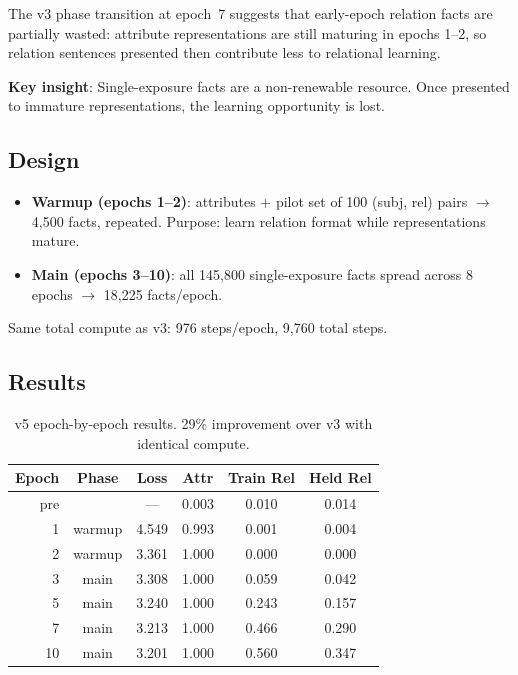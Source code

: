 \documentclass[11pt]{article}
\begin{document}
The v3 phase transition at epoch~7 suggests that early-epoch relation facts are
partially wasted: attribute representations are still maturing in epochs 1--2, so
relation sentences presented then contribute less to relational learning.

\textbf{Key insight}: Single-exposure facts are a non-renewable resource.  Once
presented to immature representations, the learning opportunity is lost.

\subsection{Design}

\begin{itemize}
\item \textbf{Warmup (epochs 1--2)}: attributes + pilot set of 100 (subj, rel)
  pairs $\to$ 4,500 facts, repeated.  Purpose: learn relation format while
  representations mature.
\item \textbf{Main (epochs 3--10)}: all 145,800 single-exposure facts spread across
  8 epochs $\to$ 18,225 facts/epoch.
\end{itemize}

Same total compute as v3: 976 steps/epoch, 9,760 total steps.

\subsection{Results}

\begin{table}[h]
\centering
\caption{v5 epoch-by-epoch results. 29\% improvement over v3 with identical compute.}
\label{tab:v5}
\begin{tabular}{rccccc}
\toprule
Epoch & Phase & Loss & Attr & Train Rel & Held Rel \\
\midrule
pre & & --- & 0.003 & 0.010 & 0.014 \\
1 & warmup & 4.549 & 0.993 & 0.001 & 0.004 \\
2 & warmup & 3.361 & 1.000 & 0.000 & 0.000 \\
3 & main & 3.308 & 1.000 & 0.059 & 0.042 \\
5 & main & 3.240 & 1.000 & 0.243 & 0.157 \\
7 & main & 3.213 & 1.000 & 0.466 & 0.290 \\
10 & main & 3.201 & 1.000 & 0.560 & 0.347 \\
\bottomrule
\end{tabular}
\end{table}
\end{document}
